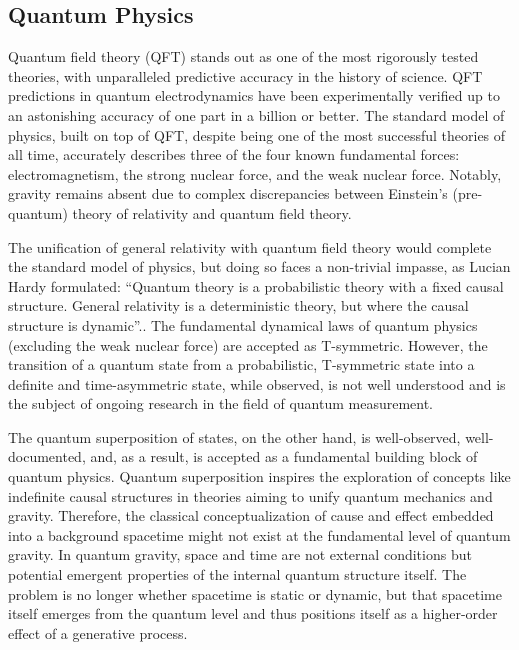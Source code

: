 \subsection{Quantum Physics}
\label{sec:history_quantum}

Quantum field theory\cite{peskin2018introduction} (QFT) stands out as one of the most rigorously tested theories, with unparalleled predictive accuracy in the history of science. QFT predictions in quantum electrodynamics have been experimentally verified up to an astonishing accuracy of one part in a billion or better. The standard model of physics, built on top of QFT, despite being one of the most successful theories of all time, accurately describes three of the four known fundamental forces: electromagnetism, the strong nuclear force, and the weak nuclear force. Notably, gravity remains absent due to complex discrepancies between Einstein’s (pre-quantum) theory of relativity and quantum field theory.

The unification of general relativity with quantum field theory would complete the standard model of physics, but doing so faces a non-trivial impasse, as Lucian Hardy formulated: ``Quantum theory is a probabilistic theory with a fixed causal structure. General relativity is a deterministic theory, but where the causal structure is dynamic''\cite{HardyDynamicCausalStructure}.. The fundamental dynamical laws of quantum physics (excluding the weak nuclear force) are accepted as T-symmetric. However, the transition of a quantum state from a probabilistic, T-symmetric state into a definite and time-asymmetric state, while observed, is not well understood and is the subject of ongoing research in the field of quantum measurement.

The quantum superposition of states, on the other hand, is well-observed, well-documented, and, as a result, is accepted as a fundamental building block of quantum physics. Quantum superposition inspires the exploration of concepts like indefinite causal structures in theories aiming to unify quantum mechanics and gravity. Therefore, the classical conceptualization of cause and effect embedded into a background spacetime might not exist at the fundamental level of quantum gravity. In quantum gravity, space and time are not external conditions but potential emergent properties of the internal quantum structure itself. The problem is no longer whether spacetime is static or dynamic, but that spacetime itself emerges from the quantum level and thus positions itself as a higher-order effect of a generative process.

